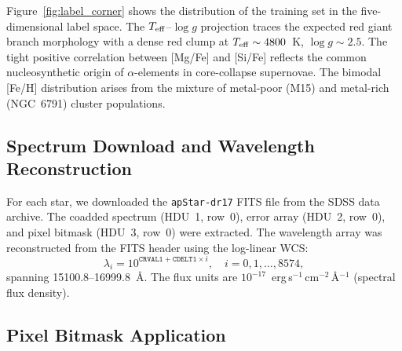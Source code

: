 \documentclass[10pt,preprint2]{aastex}
\begin{document}
Figure~\ref{fig:label_corner} shows the distribution of the training set in the five-dimensional label space. The $T_{\rm eff}$--$\log g$ projection traces the expected red giant branch morphology with a dense red clump at $T_{\rm eff} \sim 4800$~K, $\log g \sim 2.5$. The tight positive correlation between [Mg/Fe] and [Si/Fe] reflects the common nucleosynthetic origin of $\alpha$-elements in core-collapse supernovae. The bimodal [Fe/H] distribution arises from the mixture of metal-poor (M15) and metal-rich (NGC~6791) cluster populations.

\subsection{Spectrum Download and Wavelength Reconstruction}

For each star, we downloaded the \texttt{apStar-dr17} FITS file from the SDSS data archive. The coadded spectrum (HDU~1, row~0), error array (HDU~2, row~0), and pixel bitmask (HDU~3, row~0) were extracted. The wavelength array was reconstructed from the FITS header using the log-linear WCS:
\begin{equation}
  \lambda_i = 10^{\texttt{CRVAL1} + \texttt{CDELT1} \times i}, \quad i = 0, 1, \ldots, 8574,
\end{equation}
spanning 15100.8--16999.8~\AA. The flux units are $10^{-17}$~erg\,s$^{-1}$\,cm$^{-2}$\,\AA$^{-1}$ (spectral flux density).

\subsection{Pixel Bitmask Application}
\end{document}

